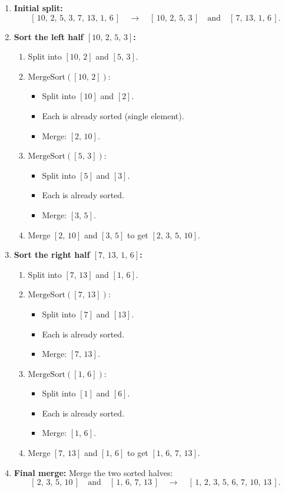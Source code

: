 \documentclass[11pt,a4paper]{article}
\begin{document}
\begin{enumerate}
  \item \textbf{Initial split:}
  \[
    [\,10,\, 2,\, 5,\, 3,\, 7,\, 13,\, 1,\, 6\,]
    \quad\longrightarrow\quad
    [\,10,\, 2,\, 5,\, 3\,] \quad\text{and}\quad [\,7,\, 13,\, 1,\, 6\,].
  \]

  \item \textbf{Sort the left half \([10,\, 2,\, 5,\, 3]\):}
  \begin{enumerate}
    \item Split into \([10,\, 2]\) and \([5,\, 3]\).
    \item \(\text{MergeSort}([10,\, 2])\):
    \begin{itemize}
      \item Split into \([10]\) and \([2]\).
      \item Each is already sorted (single element).
      \item Merge: \([2,\, 10]\).
    \end{itemize}
    \item \(\text{MergeSort}([5,\, 3])\):
    \begin{itemize}
      \item Split into \([5]\) and \([3]\).
      \item Each is already sorted.
      \item Merge: \([3,\, 5]\).
    \end{itemize}
    \item Merge \([2,\, 10]\) and \([3,\, 5]\) to get \([2,\, 3,\, 5,\, 10]\).
  \end{enumerate}

  \item \textbf{Sort the right half \([7,\, 13,\, 1,\, 6]\):}
  \begin{enumerate}
    \item Split into \([7,\, 13]\) and \([1,\, 6]\).
    \item \(\text{MergeSort}([7,\, 13])\):
    \begin{itemize}
      \item Split into \([7]\) and \([13]\).
      \item Each is already sorted.
      \item Merge: \([7,\, 13]\).
    \end{itemize}
    \item \(\text{MergeSort}([1,\, 6])\):
    \begin{itemize}
      \item Split into \([1]\) and \([6]\).
      \item Each is already sorted.
      \item Merge: \([1,\, 6]\).
    \end{itemize}
    \item Merge \([7,\, 13]\) and \([1,\, 6]\) to get \([1,\, 6,\, 7,\, 13]\).
  \end{enumerate}

  \item \textbf{Final merge:} Merge the two sorted halves:
  \[
    [\,2,\, 3,\, 5,\, 10\,] \quad\text{and}\quad [\,1,\, 6,\, 7,\, 13\,]
    \quad\longrightarrow\quad [\,1,\, 2,\, 3,\, 5,\, 6,\, 7,\, 10,\, 13\,].
  \]
\end{enumerate}
\end{document}
